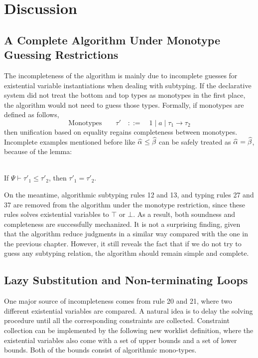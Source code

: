 
\section{Discussion}


\subsection{A Complete Algorithm Under Monotype Guessing Restrictions}

The incompleteness of the algorithm is mainly due to incomplete guesses
for existential variable instantiations when dealing with subtyping.
If the declarative system did not treat the bottom and top types
as monotypes in the first place,
the algorithm would not need to guess those types.
Formally, if monotypes are defined as follows,
$$\text{Monotypes}\qquad \tau' \quad  ::= \quad 1 \mid a \mid \tau_1\to \tau_2$$
then unification based on equality regains completeness between monotypes.
Incomplete examples mentioned before like $\al \le \bt$ can be safely treated as $\al = \bt$,
because of the lemma:
\begin{lemma}~\\
    If $\Psi \vdash \tau'_1 \le \tau'_2$, then $\tau'_1 = \tau'_2$.
\end{lemma}

On the meantime, algorithmic subtyping rules 12 and 13, and typing rules 27 and 37
are removed from the algorithm under the monotype restriction,
since these rules solves existential variables to $\top$ or $\bot$.
As a result, both soundness and completeness are successfully mechanized.
It is not a surprising finding,
given that the algorithm reduce judgments in a similar way
compared with the one in the previous chapter.
However, it still reveals the fact that
if we do not try to guess any subtyping relation,
the algorithm should remain simple and complete.


\subsection{Lazy Substitution and Non-terminating Loops}\label{subsec:lazy_subst}

One major source of incompleteness comes from rule 20 and 21,
where two different existential variables are compared.
A natural idea is to delay the solving procedure until all the corresponding
constraints are collected.
Constraint collection can be implemented by the following new worklist definition,
where the existential variables also come with a set of upper bounds
and a set of lower bounds. Both of the bounds consist of algorithmic mono-types.

